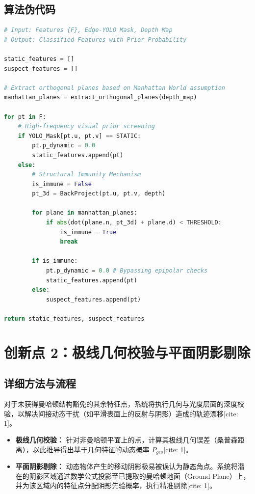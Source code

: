 \documentclass[11pt, a4paper]{ctexart}
\begin{document}
\subsection{算法伪代码}
\begin{lstlisting}[language=Python, caption={Visual Prior and Manhattan Immunity}]
# Input: Features {F}, Edge-YOLO Mask, Depth Map
# Output: Classified Features with Prior Probability

static_features = []
suspect_features = []

# Extract orthogonal planes based on Manhattan World assumption
manhattan_planes = extract_orthogonal_planes(depth_map) 

for pt in F:
    # High-frequency visual prior screening
    if YOLO_Mask[pt.u, pt.v] == STATIC:
        pt.p_dynamic = 0.0
        static_features.append(pt)
    else:
        # Structural Immunity Mechanism
        is_immune = False
        pt_3d = BackProject(pt.u, pt.v, depth)
        
        for plane in manhattan_planes:
            if abs(dot(plane.n, pt_3d) + plane.d) < THRESHOLD:
                is_immune = True
                break
                
        if is_immune:
            pt.p_dynamic = 0.0 # Bypassing epipolar checks
            static_features.append(pt)
        else:
            suspect_features.append(pt)
            
return static_features, suspect_features
\end{lstlisting}

\vspace{1em}

\section{创新点 2：极线几何校验与平面阴影剔除}

\subsection{详细方法与流程}
对于未获得曼哈顿结构豁免的其余特征点，系统将执行几何与光度层面的深度校验，以解决间接动态干扰（如平滑表面上的反射与阴影）造成的轨迹漂移[cite: 1]。

\begin{itemize}[label=$\bullet$]
    \item \textbf{极线几何校验：} 针对非曼哈顿平面上的点，计算其极线几何误差（桑普森距离），以此推导得出基于几何特征的动态概率 $P_{geo}$[cite: 1]。
    \item \textbf{平面阴影剔除：} 动态物体产生的移动阴影极易被误认为静态角点。系统将潜在的阴影区域通过数学公式投影至已提取的曼哈顿地面（Ground Plane）上，并为该区域内的特征点分配阴影先验概率，执行精准剔除[cite: 1]。
\end{itemize}
\end{document}
